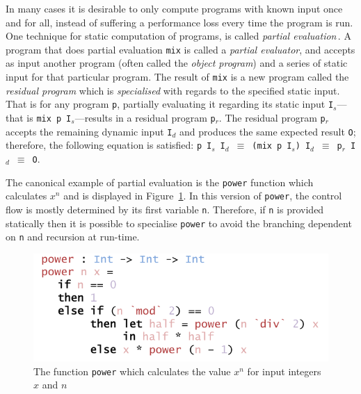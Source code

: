 \documentclass{ituthesis}
\newcommand{\ttdec}[1]{\textcolor{declared-var-color}{\texttt{#1}}}
\newcommand{\ttvar}[1]{\textcolor{local-var-color}{\texttt{#1}}}
\theoremstyle{break}
\begin{document}
In many cases it is desirable to only compute programs with known input once and for all, instead of suffering a performance loss every time the program is run.
One technique for static computation of programs, is called \textit{partial evaluation}\,\autocite{Jones:1993:PEA:153676}. A program that does partial evaluation \ttdec{mix} is called a \textit{partial evaluator}, and accepts as input another program (often called the \textit{object program}) and a series of static input for that particular program.
The result of \ttdec{mix} is a new program called the \textit{residual program} which is \textit{specialised} with regards to the specified static input.
That is for any program \ttvar{p}, partially evaluating it regarding its static input \ttvar{I$_s$}---that is \ttdec{mix}~\ttvar{p}~\ttvar{I$_s$}---results in a residual program \ttvar{p$_r$}.
The residual program \ttvar{p$_r$} accepts the remaining dynamic input \ttvar{I$_d$} and produces the same expected result \ttvar{O}; therefore, the following equation is satisfied: \ttvar{p}~\ttvar{I$_s$}~\ttvar{I$_d$}~\texttt{$\equiv$}~\texttt{(}\ttdec{mix}~\ttvar{p}~\ttvar{I$_s$}\texttt{)}~\ttvar{I$_d$}~\texttt{$\equiv$}~\ttvar{p$_r$}~\ttvar{I$_d$}~\texttt{$\equiv$}~\ttvar{O}.

The canonical example of partial evaluation \autocite{Jones:1993:PEA:153676,mogensen1997,taha2004gentle} is the \ttdec{power} function which calculates $x^n$ and is displayed in Figure~\ref{fig:powexmp}.
In this version of \ttdec{power}, the control flow is mostly determined by its first variable \ttvar{n}.
Therefore, if \ttvar{n} is provided statically then it is possible to specialise \ttdec{power} to avoid the branching dependent on \ttvar{n} and recursion at run-time.

\begin{figure}[ht]
\begin{center}
    \includegraphics[scale=0.5]{Figures/PowerExample.png}
\end{center}
\caption{The function \ttdec{power} which calculates the value $x^n$ for input integers $x$ and $n$}
\label{fig:powexmp}
\end{figure}
\end{document}
